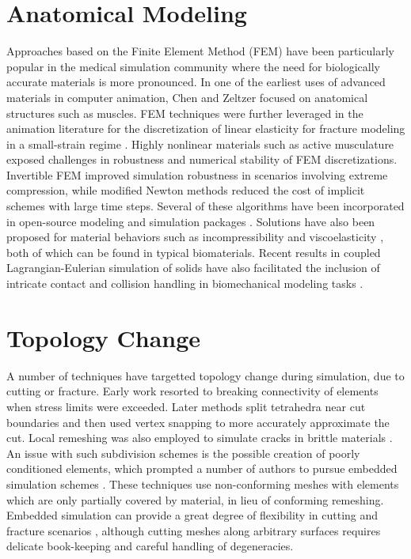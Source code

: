 \documentclass[12pt,oneside,letterpaper]{memoir}
\begin{document}
\section{Anatomical Modeling}
Approaches based on the Finite Element Method (FEM) have been
particularly popular in the medical simulation community
\cite{MarchADC:2008} where the need for biologically accurate
materials is more pronounced. In one of the earliest uses of advanced
materials in computer animation, Chen and Zeltzer
 focused on anatomical structures such as
muscles. FEM techniques were further leveraged in the animation
literature for the discretization of linear elasticity for fracture
modeling in a small-strain regime \cite{OBriH:1999}. Highly nonlinear
materials such as active musculature \cite{TeranBHF:2003} exposed
challenges in robustness and numerical stability of FEM
discretizations. Invertible FEM \cite{IrvinTF:2004} improved
simulation robustness in scenarios involving extreme compression,
while modified Newton methods \cite{TeranSIF:2005} reduced the cost of
implicit schemes with large time steps. Several of these algorithms
have been incorporated in open-source modeling and simulation packages
\cite{SinSB:2013}. Solutions have also been proposed for material
behaviors such as incompressibility \cite{IrvinSF:2007} and
viscoelasticity \cite{GokteBO:2004,WojtaT:2008}, both of which can be
found in typical biomaterials.  Recent results in coupled
Lagrangian-Eulerian simulation of solids have also facilitated the
inclusion of intricate contact and collision handling in biomechanical
modeling tasks \cite{SuedaKP:2008,LiSNP:2013,FanLP:2014}.

\section{Topology Change}

A number of techniques have targetted topology change during
simulation, due to cutting or fracture. Early work \cite{TerzoF:1988b}
resorted to breaking connectivity of elements when stress limits were
exceeded. Later methods \cite{NienhS:2001} split tetrahedra near cut
boundaries and then used vertex snapping to more accurately
approximate the cut. Local remeshing was also employed to simulate
cracks in brittle materials \cite{OBriH:1999}. An issue with such
subdivision schemes is the possible creation of poorly conditioned
elements, which prompted a number of authors to pursue embedded
simulation schemes \cite{MolinBF:2004,TeranSBNLF:2005}. These
techniques use non-conforming meshes with elements which are only
partially covered by material, in lieu of conforming
remeshing. Embedded simulation can provide a great degree of
flexibility in cutting and fracture scenarios \cite{SifakDF:2007},
although cutting meshes along arbitrary surfaces requires delicate
book-keeping and careful handling of degeneracies.
\end{document}
